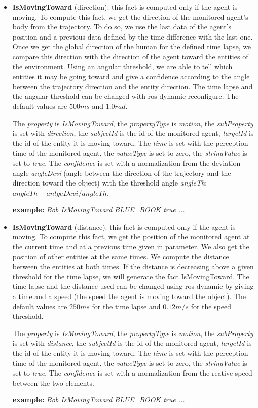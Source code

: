\documentclass[a4paper]{article}
\begin{document}
\begin{itemize}
\item \textbf{IsMovingToward} (direction): this fact is computed only if the agent is moving.
To compute this fact, we get the direction of the monitored agent's body from the trajectory.
To do so, we use the last data of the agent's position and a previous data defined by the time difference with the last one. Once we get the global direction of the human for the defined time lapse, we compare this direction with the direction of the agent toward the entities of the environment. Using an angular threshold, we are able to tell which entities it may be going toward and give a confidence according to the angle between the trajectory direction and the entity direction.
The time lapse and the angular threshold can be changed with ros dynamic reconfigure. The default values are $500 ms$ and $1.0 rad$.

The \textit{property} is \textit{IsMovingToward}, the \textit{propertyType} is \textit{motion}, the \textit{subProperty} is set with \textit{direction}, the \textit{subjectId} is the id of the monitored agent, \textit{targetId} is the id of the entity it is moving toward. The \textit{time} is set with the perception time of the monitored agent, the \textit{valueType} is set to zero, the \textit{stringValue} is set to \textit{true}. The \textit{confidence} is set with a normalization from the deviation angle \textit{angleDevi} (angle between the direction of the trajectory and the direction toward the object) with the threshold angle \textit{angleTh}: $angleTh-anlgeDevi/angleTh$.

\textbf{example:} \textit{Bob IsMovingToward BLUE\_BOOK true  ...}

\item \textbf{IsMovingToward} (distance): this fact is computed only if the agent is moving.
To compute this fact, we get the position of the monitored agent at the current time and at a previous time given in parameter. We also get the position of other entities at the same times. We compute the distance between the entities at both times. If the distance is decreasing above a given threshold for the time lapse, we will generate the fact IsMovingToward. The time lapse and the distance used can be changed using ros dynamic by giving a time and a speed (the speed the agent is moving toward the object). The default values are $250 ms$ for the time lapse and $0.12 m/s$ for the speed threshold.

The \textit{property} is \textit{IsMovingToward}, the \textit{propertyType} is \textit{motion}, the \textit{subProperty} is set with \textit{distance}, the \textit{subjectId} is the id of the monitored agent, \textit{targetId} is the id of the entity it is moving toward. The \textit{time} is set with the perception time of the monitored agent, the \textit{valueType} is set to zero, the \textit{stringValue} is set to \textit{true}. The \textit{confidence} is set with a normalization from the reative speed between the two elements.

\textbf{example:} \textit{Bob IsMovingToward BLUE\_BOOK true  ...}

\end{itemize}
\end{document}
